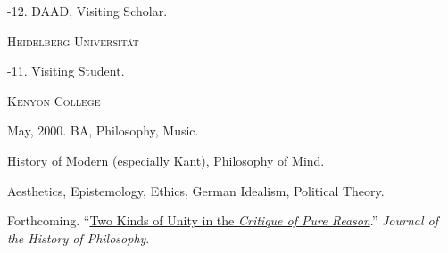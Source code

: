 \documentclass[11pt]{article}
\begin{document}
-12. DAAD, Visiting Scholar.

\medskip
\noindent\textsc{Heidelberg Universität\vspace{0.01in}}

-11. Visiting Student.

\medskip
\noindent\textsc{Kenyon College\vspace{0.02in}}

\ind May, 2000. BA, Philosophy, Music.

\bigskip
 

\medskip

\ind History of Modern (especially Kant), Philosophy of Mind.

\medskip

\medskip

\ind Aesthetics, Epistemology, Ethics, German Idealism, Political Theory.

\medskip






 
\normalsize

\medskip

\medskip

 

\ind Forthcoming. ``\href{https://www.dropbox.com/s/rpey031drd2low5/KantUnity.pdf}{Two Kinds of Unity in the \emph{Critique of Pure Reason}}.'' \emph{Journal of the History of Philosophy}.
\end{document}
